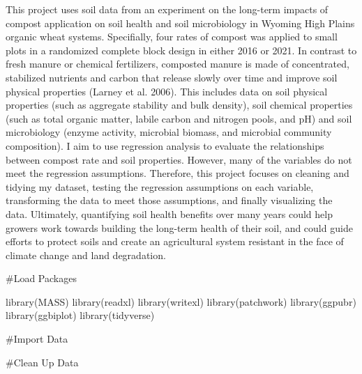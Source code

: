 \documentclass[
]{article}
\newenvironment{Shaded}{\begin{snugshade}}{\end{snugshade}}
\newcommand{\FunctionTok}[1]{\textcolor[rgb]{0.00,0.00,0.00}{#1}}
\newcommand{\NormalTok}[1]{#1}
\begin{document}
This project uses soil data from an experiment on the long-term impacts
of compost application on soil health and soil microbiology in Wyoming
High Plains organic wheat systems. Specifially, four rates of compost
was applied to small plots in a randomized complete block design in
either 2016 or 2021. In contrast to fresh manure or chemical
fertilizers, composted manure is made of concentrated, stabilized
nutrients and carbon that release slowly over time and improve soil
physical properties (Larney et al. 2006). This includes data on soil
physical properties (such as aggregate stability and bulk density), soil
chemical properties (such as total organic matter, labile carbon and
nitrogen pools, and pH) and soil microbiology (enzyme activity,
microbial biomass, and microbial community composition). I aim to use
regression analysis to evaluate the relationships between compost rate
and soil properties. However, many of the variables do not meet the
regression assumptions. Therefore, this project focuses on cleaning and
tidying my dataset, testing the regression assumptions on each variable,
transforming the data to meet those assumptions, and finally visualizing
the data. Ultimately, quantifying soil health benefits over many years
could help growers work towards building the long-term health of their
soil, and could guide efforts to protect soils and create an
agricultural system resistant in the face of climate change and land
degradation.

\#Load Packages

\begin{Shaded}
\begin{Highlighting}[]
\FunctionTok{library}\NormalTok{(MASS)}
\FunctionTok{library}\NormalTok{(readxl)}
\FunctionTok{library}\NormalTok{(writexl)}
\FunctionTok{library}\NormalTok{(patchwork)}
\FunctionTok{library}\NormalTok{(ggpubr)}
\FunctionTok{library}\NormalTok{(ggbiplot)}
\FunctionTok{library}\NormalTok{(tidyverse)}
\end{Highlighting}
\end{Shaded}

\#Import Data

\#Clean Up Data
\end{document}
